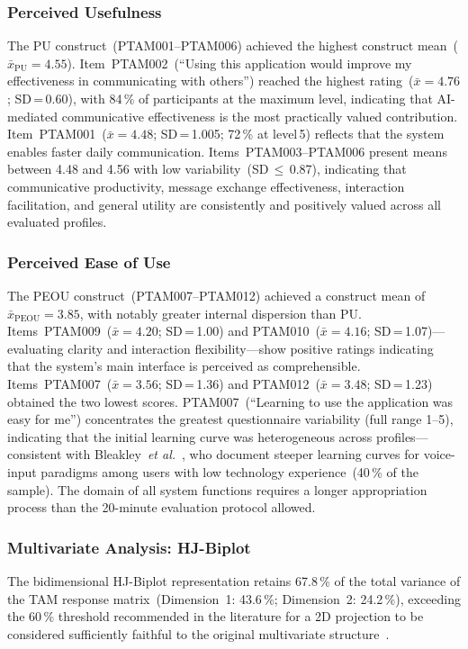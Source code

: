 \documentclass[journal]{IEEEtran}
\begin{document}
	\subsubsection{Perceived Usefulness}
	The PU construct~(PTAM001--PTAM006) achieved the highest
	construct mean~($\bar{x}_{\text{PU}}{=}4.55$).
	Item~PTAM002~(``Using this application would improve my
	effectiveness in communicating with others'') reached the
	highest rating~($\bar{x}{=}4.76$; SD\,=\,0.60), with
	84\,\% of participants at the maximum level, indicating that
	AI-mediated communicative effectiveness is the most practically
	valued contribution.
	Item~PTAM001~($\bar{x}{=}4.48$; SD\,=\,1.005; 72\,\% at
	level\,5) reflects that the system enables faster daily
	communication.
	Items~PTAM003--PTAM006 present means between 4.48 and 4.56
	with low variability~(SD\,$\leq$\,0.87), indicating that
	communicative productivity, message exchange effectiveness,
	interaction facilitation, and general utility are consistently
	and positively valued across all evaluated profiles.
	
	\subsubsection{Perceived Ease of Use}
	The PEOU construct~(PTAM007--PTAM012) achieved a construct
	mean of $\bar{x}_{\text{PEOU}}{=}3.85$, with notably greater
	internal dispersion than PU.
	Items~PTAM009~($\bar{x}{=}4.20$; SD\,=\,1.00) and
	PTAM010~($\bar{x}{=}4.16$; SD\,=\,1.07)---evaluating clarity
	and interaction flexibility---show positive ratings indicating
	that the system's main interface is perceived as comprehensible.
	Items~PTAM007~($\bar{x}{=}3.56$; SD\,=\,1.36) and
	PTAM012~($\bar{x}{=}3.48$; SD\,=\,1.23) obtained the two
	lowest scores.
	PTAM007~(``Learning to use the application was easy for me'')
	concentrates the greatest questionnaire variability (full range
	1--5), indicating that the initial learning curve was
	heterogeneous across profiles---consistent with
	Bleakley~\textit{et al.}~\cite{bleakley2022}, who document
	steeper learning curves for voice-input paradigms among users
	with low technology experience~(40\,\% of the sample).
	The domain of all system functions requires a longer
	appropriation process than the 20-minute evaluation protocol
	allowed.
	
	\subsubsection{Multivariate Analysis: HJ-Biplot}
	The bidimensional HJ-Biplot representation retains 67.8\,\% of
	the total variance of the TAM response matrix~(Dimension~1:
	43.6\,\%; Dimension~2: 24.2\,\%), exceeding the 60\,\%
	threshold recommended in the literature for a 2D projection to
	be considered sufficiently faithful to the original multivariate
	structure~\cite{galindo1986,cubilla2021}.
	
\end{document}
